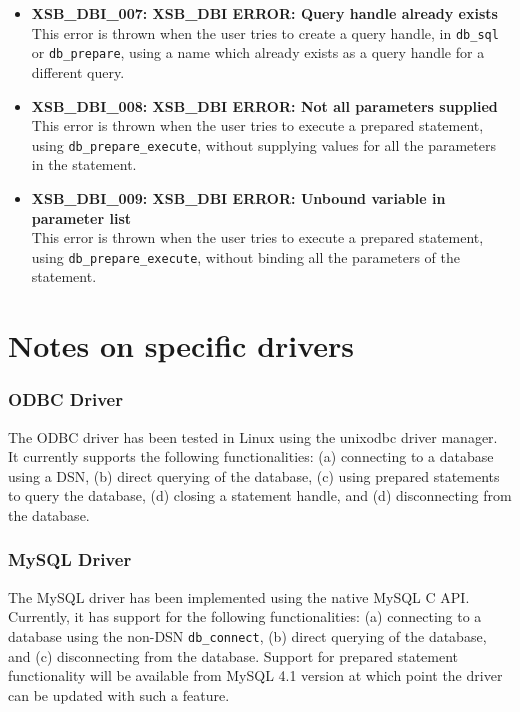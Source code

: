 \begin{itemize}
\item {\bf XSB\_DBI\_007: XSB\_DBI ERROR: Query handle already exists}\\
This error is thrown when the user tries to create a query handle, in
{\tt db\_sql} or {\tt db\_prepare}, using a name which already exists as
a query handle for a different query.

\item {\bf XSB\_DBI\_008: XSB\_DBI ERROR: Not all parameters supplied}\\
This error is thrown when the user tries to execute a prepared statement,
using {\tt db\_prepare\_execute}, without supplying values for all the
parameters in the statement.

\item {\bf XSB\_DBI\_009: XSB\_DBI ERROR: Unbound variable in parameter list}\\
This error is thrown when the user tries to execute a prepared statement,
using {\tt db\_prepare\_execute}, without binding all the parameters of the
statement.

\end{itemize}

\section{Notes on specific drivers}

\subsubsection{ODBC Driver}

The ODBC driver has been tested in Linux using the unixodbc driver manager.
It currently supports the following functionalities: (a) connecting to a 
database using a DSN, (b) direct querying of the database, (c) using 
prepared statements to query the database, (d) closing a statement handle, and
(d) disconnecting from the database. 

\subsubsection{MySQL Driver}

The MySQL driver has been implemented using the native MySQL C API. Currently, it
has support for the following functionalities: (a) connecting to 
a database using the non-DSN {\tt db\_connect}, (b) direct querying of
the database, and (c) disconnecting from the database. Support for prepared
statement functionality will be available from MySQL 4.1 version at which
point the driver can be updated with such a feature.


